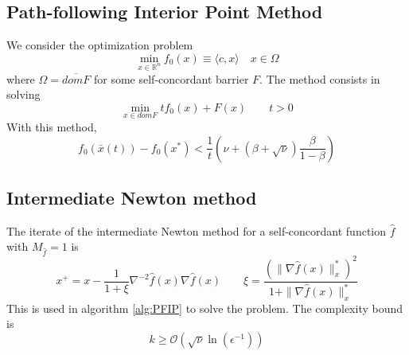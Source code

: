 \documentclass[12pt, openany]{report}
\newcommand{\R}{\mathbb{R}}
\theoremstyle{definition}
\begin{document}
\subsection{Path-following Interior Point Method}
We consider the optimization problem 
\begin{equation}
	\min_{x\in \R^n} f_0(x)\equiv \langle c,x\rangle \quad x\in \Omega
\end{equation}
where $\Omega = \overline{domF}$ for some self-concordant barrier $F$. The method consists in solving 
\begin{equation}
	\min_{x\in domF}tf_0(x) + F(x)\qquad t>0
\end{equation}
With this method, 
\begin{equation}
	f_0(\bar x(t)) - f_0(x^*) < \frac{1}{t}\left(\nu + (\beta +\sqrt{\nu}) \frac{\beta}{1-\beta}\right)
\end{equation}
\subsection{Intermediate Newton method}
The iterate of the intermediate Newton method for a self-concordant function $\hat f$ with $M_{\hat f} = 1$ is 
\begin{equation}
	x^+ = x - \frac{1}{1+\xi} \nabla^{-2}\hat f(x)\nabla \hat f(x) \qquad \xi = \frac{(\|\nabla \hat f(x)\|_x^*)^2}{1+\|\nabla \hat f(x)\|_x^*}
\end{equation}
This is used in algorithm \ref{alg:PFIP} to solve the problem. The complexity bound is 
\begin{equation}
	k\ge \mathcal{O}(\sqrt{\nu}\ln(\epsilon^{-1}))
\end{equation}
\end{document}
